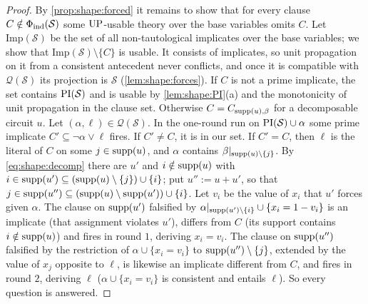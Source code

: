 \begin{proof}
By \cref{prop:shape:forced} it remains to show that for every clause $C\notin\Phi_{\rm ind}(\mathcal S)$ some $\mathrm{UP}$-usable theory over the base variables omits $C$. Let $\mathrm{Imp}(\mathcal S)$ be the set of all non-tautological implicates over the base variables; we show that $\mathrm{Imp}(\mathcal S)\setminus\{C\}$ is usable. It consists of implicates, so unit propagation on it from a consistent antecedent never conflicts, and once it is compatible with $\mathcal Q(\mathcal S)$ its projection is $\mathcal S$ (\cref{lem:shape:forces}). If $C$ is not a prime implicate, the set contains $\mathrm{PI}(\mathcal S)$ and is usable by \cref{lem:shape:PI}(a) and the monotonicity of unit propagation in the clause set. Otherwise $C=C_{\operatorname{supp}(u),\beta}$ for a decomposable circuit $u$. Let $(\alpha,\ell)\in\mathcal Q(\mathcal S)$. In the one-round run on $\mathrm{PI}(\mathcal S)\cup\alpha$ some prime implicate $C'\subseteq\neg\alpha\vee\ell$ fires. If $C'\ne C$, it is in our set. If $C'=C$, then $\ell$ is the literal of $C$ on some $j\in\operatorname{supp}(u)$, and $\alpha$ contains $\beta|_{\operatorname{supp}(u)\setminus\{j\}}$. By \eqref{eq:shape:decomp} there are $u'$ and $i\notin\operatorname{supp}(u)$ with $i\in\operatorname{supp}(u')\subseteq(\operatorname{supp}(u)\setminus\{j\})\cup\{i\}$; put $u'':=u+u'$, so that $j\in\operatorname{supp}(u'')\subseteq(\operatorname{supp}(u)\setminus\operatorname{supp}(u'))\cup\{i\}$. Let $v_i$ be the value of $x_i$ that $u'$ forces given $\alpha$. The clause on $\operatorname{supp}(u')$ falsified by $\alpha|_{\operatorname{supp}(u')\setminus\{i\}}\cup\{x_i=1-v_i\}$ is an implicate (that assignment violates $u'$), differs from $C$ (its support contains $i\notin\operatorname{supp}(u)$) and fires in round $1$, deriving $x_i=v_i$. The clause on $\operatorname{supp}(u'')$ falsified by the restriction of $\alpha\cup\{x_i=v_i\}$ to $\operatorname{supp}(u'')\setminus\{j\}$, extended by the value of $x_j$ opposite to $\ell$, is likewise an implicate different from $C$, and fires in round $2$, deriving $\ell$ ($\alpha\cup\{x_i=v_i\}$ is consistent and entails $\ell$). So every question is answered.
\end{proof}

